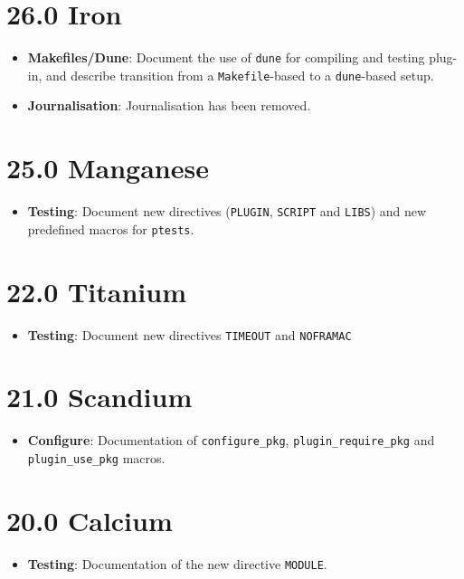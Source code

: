 \section*{26.0 Iron}
\begin{itemize}
\item \textbf{Makefiles/Dune}: Document the use of \texttt{dune} for compiling
and testing plug-in, and describe transition from a \texttt{Makefile}-based to
a \texttt{dune}-based setup.
\item \textbf{Journalisation}: Journalisation has been removed.
\end{itemize}

\section*{25.0 Manganese}
\begin{itemize}
\item \textbf{Testing}: Document new directives (\texttt{PLUGIN}, \texttt{SCRIPT} and \texttt{LIBS}) and new predefined macros for \texttt{ptests}.
\end{itemize}

\section*{22.0 Titanium}
\begin{itemize}
\item \textbf{Testing}: Document new directives \texttt{TIMEOUT} and
\texttt{NOFRAMAC}
\end{itemize}

\section*{21.0 Scandium}
\begin{itemize}
\item \textbf{Configure}: Documentation of \texttt{configure\_pkg},
\texttt{plugin\_require\_pkg} and \texttt{plugin\_use\_pkg} macros.
\end{itemize}

\section*{20.0 Calcium}
\begin{itemize}
\item \textbf{Testing}: Documentation of the new directive \texttt{MODULE}.
\end{itemize}

